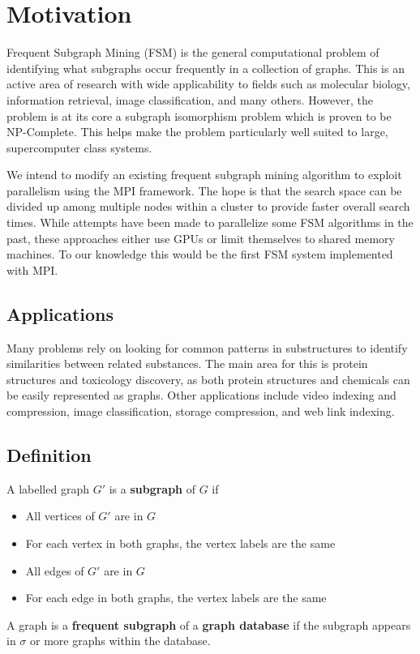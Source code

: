 \section{Motivation}
\label{sec:motivation}

Frequent Subgraph Mining (FSM) is the general computational problem of 
identifying what subgraphs occur frequently in a collection of graphs.  This 
is an active area of research with wide applicability to fields such as 
molecular biology, information retrieval, image classification, and many 
others.  However, the problem is at its core a subgraph isomorphism problem
which is proven to be NP-Complete\cite{cook1971complexity}.  This helps make
the problem particularly well suited to large, supercomputer class systems.

We intend to modify an existing frequent subgraph mining algorithm to exploit
parallelism using the MPI framework. The hope is that the search space can
be divided up among multiple nodes within a cluster to provide faster overall
search times.  While attempts have been made to parallelize some FSM 
algorithms in the past\cite{buehrer2005parallel,gspancuda}, these 
approaches either use GPUs or limit themselves to shared memory machines. 
To our knowledge this would be the first FSM system implemented with MPI.

\subsection{Applications}
\label{subsec:applications}

Many problems rely on looking for common patterns in substructures to 
identify similarities between related substances.  The main area 
for this is protein structures and toxicology discovery, as both 
protein structures\cite{substructures} and chemicals\cite{toxic} can be easily represented as 
graphs. Other applications include video indexing and compression\cite{videosub}, 
image classification\cite{plagram}, storage compression\cite{stored}, and web link 
indexing\cite{freqtrees}.

\subsection{Definition}
\label{subsec:complexity}

A labelled graph $G'$ is a {\bf subgraph} of $G$ if
\begin{itemize}
	\item{All vertices of $G'$ are in $G$}
	\item{For each vertex in both graphs, the vertex labels are the same}
	\item{All edges of $G'$ are in $G$ }
	\item{For each edge in both graphs, the vertex labels are the same}
\end{itemize}

A graph is a {\bf frequent subgraph} of a {\bf graph database} if the 
subgraph appears in $\sigma$ or more graphs within the database.


